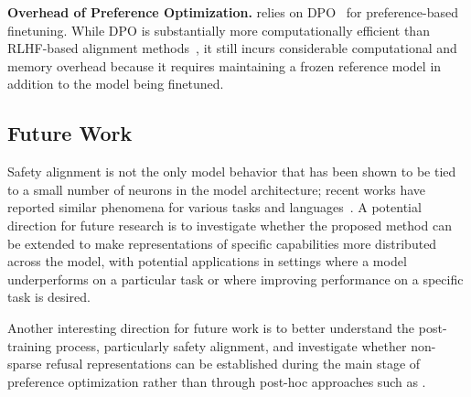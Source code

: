 \textbf{Overhead of Preference Optimization.} \method relies on DPO~\cite{rafailov2023dpo} for preference-based finetuning. While DPO is substantially more computationally efficient than RLHF-based alignment methods~\cite{rafailov2023dpo, ouyang2022rlhf}, it still incurs considerable computational and memory overhead because it requires maintaining a frozen reference model in addition to the model being finetuned.



\subsection{Future Work}
\label{subsec:future_work}

Safety alignment is not the only model behavior that has been shown to be tied to a small number of neurons in the model architecture; recent works have reported similar phenomena for various tasks and languages~\cite{tang2024language, wang2022findingskill}. A potential direction for future research is to investigate whether the proposed method can be extended to make representations of specific capabilities more distributed across the model, with potential applications in settings where a model underperforms on a particular task or where improving performance on a specific task is desired.

Another interesting direction for future work is to better understand the post-training process, particularly safety alignment, and investigate whether non-sparse refusal representations can be established during the main stage of preference optimization rather than through post-hoc approaches such as \method.